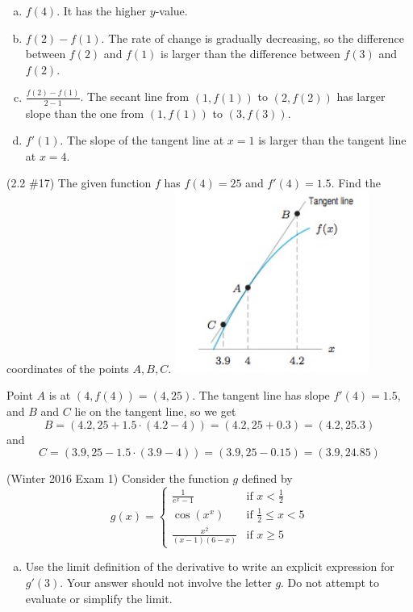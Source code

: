 \documentclass[11pt]{exam}
\begin{document}
\begin{questions}
\begin{solution}
\begin{enumerate}[(a)]
           \item \(f(4)\). It has the higher \(y\)-value.
           \item \(f(2)-f(1)\). The rate of change is gradually
             decreasing, so the difference between \(f(2)\) and
             \(f(1)\) is larger than the difference between \(f(3)\)
             and \(f(2)\).
           \item \(\frac{f(2)-f(1)}{2-1}\). The secant line from
             \((1,f(1))\) to \((2,f(2))\) has larger slope than the
             one from \((1,f(1))\) to \((3,f(3))\).
           \item \(f'(1)\). The slope of the tangent line at \(x=1\)
             is larger than the tangent line at \(x=4\).
           \end{enumerate}
         \end{solution}
\question (2.2 \#17) The given function $f$ has $f(4)=25$ and $f'(4)=1.5$.  Find the coordinates of the points $A, B, C$.
\includegraphics[width=2.5in]{Figures/no17graph.jpg}
\begin{solution}
  Point \(A\) is at \((4,f(4)) = (4,25)\). The tangent line has slope
  \(f'(4) = 1.5\), and \(B\) and \(C\) lie on the tangent line, so we
  get \[
    B = (4.2,25+1.5\cdot(4.2-4)) = (4.2,25+0.3) = (4.2,25.3)
  \]
  and \[
    C = (3.9,25-1.5\cdot(3.9-4)) = (3.9,25-0.15) = (3.9, 24.85)
  \]
\end{solution}
\question (Winter 2016 Exam 1)
Consider the function $g$ defined by
$$g(x) = \left\lbrace\begin{array}{ll} \frac{1}{e^x-1} & \textrm{if } x<\frac{1}{2} \\ \cos(x^x) & \textrm{if } \frac{1}{2} \leqslant x < 5 \\ \frac{x^2}{(x-1)(6-x)} & \textrm{if } x \geqslant 5\end{array}\right.$$
\begin{enumerate}[(a)]
\item Use the limit definition of the derivative to write an explicit expression for $g'(3)$. Your answer should not involve the letter $g$. Do not attempt to evaluate or simplify the limit.

\end{enumerate}
\end{questions}
\end{document}
